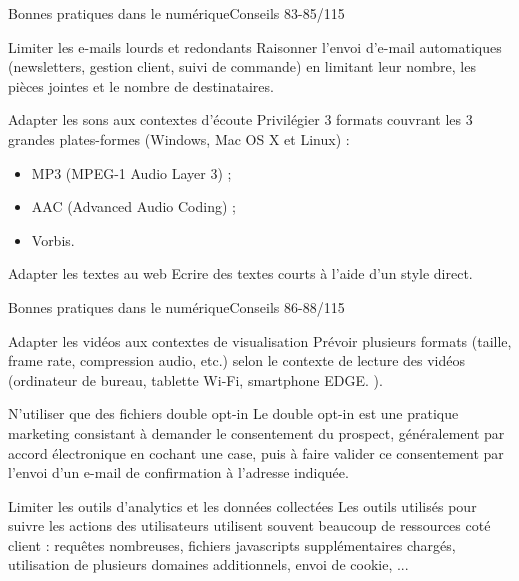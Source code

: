 \begin{frame}{Bonnes pratiques dans le numérique}{Conseils 83-85/115}
\begin{block}{Limiter les e-mails lourds et redondants}
Raisonner l'envoi d'e-mail automatiques (newsletters, gestion client, suivi de commande) en limitant leur nombre, les pièces jointes et le nombre de destinataires.
\end{block}

\begin{block}{Adapter les sons aux contextes d'écoute}
Privilégier 3 formats couvrant les 3 grandes plates-formes (Windows, Mac OS X et Linux) :
\begin{itemize}
    \item MP3 (MPEG-1 Audio Layer 3) ;
    \item  AAC (Advanced Audio Coding) ;
    \item Vorbis.
\end{itemize}
\end{block}

\begin{block}{Adapter les textes au web}
Ecrire des textes courts à l’aide d’un style direct.
\end{block}

\end{frame}

\begin{frame}{Bonnes pratiques dans le numérique}{Conseils 86-88/115}
\begin{block}{Adapter les vidéos aux contextes de visualisation}
Prévoir plusieurs formats (taille, frame rate, compression audio, etc.) selon le contexte de lecture des vidéos (ordinateur de bureau, tablette Wi-Fi, smartphone EDGE. ).
\end{block}

\begin{block}{N'utiliser que des fichiers double opt-in}
Le double opt-in est une pratique marketing consistant à demander le consentement du prospect, généralement par accord électronique en cochant une case, puis à faire valider ce consentement par l’envoi d’un e-mail de confirmation à l’adresse indiquée. 
\end{block}

\begin{block}{Limiter les outils d'analytics et les données collectées}
Les outils utilisés pour suivre les actions des utilisateurs utilisent souvent beaucoup de ressources coté client : requêtes nombreuses, fichiers javascripts supplémentaires chargés, utilisation de plusieurs domaines additionnels, envoi de cookie, ...
\end{block}

\end{frame}



